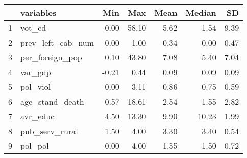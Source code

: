 \begin{table}[ht]
\centering
\begin{tabular}{rlrrrrr}
  \hline
 & variables & Min & Max & Mean & Median & SD \\ 
  \hline
1 & vot\_ed & 0.00 & 58.10 & 5.62 & 1.54 & 9.39 \\ 
  2 & prev\_left\_cab\_num & 0.00 & 1.00 & 0.34 & 0.00 & 0.47 \\ 
  3 & per\_foreign\_pop & 0.10 & 43.80 & 7.08 & 5.40 & 7.04 \\ 
  4 & var\_gdp & -0.21 & 0.44 & 0.09 & 0.09 & 0.09 \\ 
  5 & pol\_viol & 0.00 & 3.11 & 0.86 & 0.75 & 0.59 \\ 
  6 & age\_stand\_death & 0.57 & 18.61 & 2.54 & 1.55 & 2.82 \\ 
  7 & avr\_educ & 4.50 & 13.30 & 9.90 & 10.23 & 1.99 \\ 
  8 & pub\_serv\_rural & 1.50 & 4.00 & 3.30 & 3.40 & 0.54 \\ 
  9 & pol\_pol & 0.00 & 4.00 & 1.55 & 1.50 & 0.72 \\ 
   \hline
\end{tabular}
\end{table}
